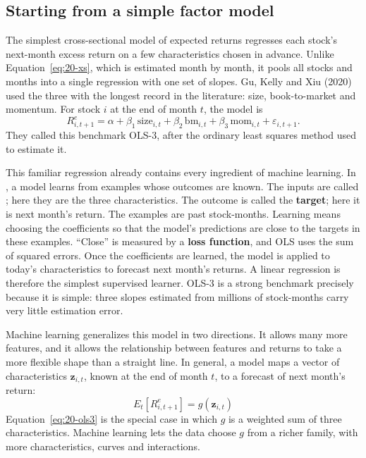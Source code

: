 \subsection{Starting from a simple factor model}
\label{sec:20-simple}

The simplest cross-sectional model of expected returns regresses each stock's next-month excess return on a few characteristics chosen in advance. Unlike Equation~\eqref{eq:20-xs}, which is estimated month by month, it pools all stocks and months into a single regression with one set of slopes. Gu, Kelly and Xiu (2020) used the three with the longest record in the literature: size, book-to-market and momentum. For stock $i$ at the end of month $t$, the model is
\begin{equation}
  R^{e}_{i,t+1} = \alpha + \beta_1\,\text{size}_{i,t} + \beta_2\,\text{bm}_{i,t} + \beta_3\,\text{mom}_{i,t} + \varepsilon_{i,t+1}.
  \label{eq:20-ols3}
\end{equation}
They called this benchmark OLS-3, after the ordinary least squares method used to estimate it.

This familiar regression already contains every ingredient of machine learning. In , a model learns from examples whose outcomes are known. The inputs are called ; here they are the three characteristics. The outcome is called the \textbf{target}; here it is next month's return. The examples are past stock-months. Learning means choosing the coefficients so that the model's predictions are close to the targets in these examples. ``Close'' is measured by a \textbf{loss function}, and OLS uses the sum of squared errors. Once the coefficients are learned, the model is applied to today's characteristics to forecast next month's returns. A linear regression is therefore the simplest supervised learner. OLS-3 is a strong benchmark precisely because it is simple: three slopes estimated from millions of stock-months carry very little estimation error.

Machine learning generalizes this model in two directions. It allows many more features, and it allows the relationship between features and returns to take a more flexible shape than a straight line. In general, a model maps a vector of characteristics $\mathbf{z}_{i,t}$, known at the end of month $t$, to a forecast of next month's return:
\begin{equation}
  E_t[R^{e}_{i,t+1}] = g(\mathbf{z}_{i,t})
  \label{eq:20-g}
\end{equation}
Equation~\eqref{eq:20-ols3} is the special case in which $g$ is a weighted sum of three characteristics. Machine learning lets the data choose $g$ from a richer family, with more characteristics, curves and interactions.

